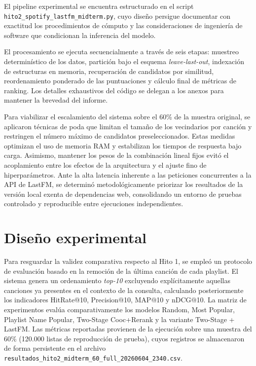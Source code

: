 \documentclass[10pt,letterpaper]{article}
\begin{document}
El pipeline experimental se encuentra estructurado en el script \texttt{hito2\_spotify\_lastfm\_midterm.py}, cuyo diseño persigue documentar con exactitud los procedimientos de cómputo y las consideraciones de ingeniería de software que condicionan la inferencia del modelo.

El procesamiento se ejecuta secuencialmente a través de seis etapas: muestreo determinístico de los datos, partición bajo el esquema \textit{leave-last-out}, indexación de estructuras en memoria, recuperación de candidatos por similitud, reordenamiento ponderado de las puntuaciones y cálculo final de métricas de ranking. Los detalles exhaustivos del código se delegan a los anexos para mantener la brevedad del informe.

Para viabilizar el escalamiento del sistema sobre el 60\% de la muestra original, se aplicaron técnicas de poda que limitan el tamaño de los vecindarios por canción y restringen el número máximo de candidatos preseleccionados. Estas medidas optimizan el uso de memoria RAM y estabilizan los tiempos de respuesta bajo carga. Asimismo, mantener los pesos de la combinación lineal fijos evitó el acoplamiento entre los efectos de la arquitectura y el ajuste fino de hiperparámetros. Ante la alta latencia inherente a las peticiones concurrentes a la API de LastFM, se determinó metodológicamente priorizar los resultados de la versión local exenta de dependencias web, consolidando un entorno de pruebas controlado y reproducible entre ejecuciones independientes.

\section{Diseño experimental}

Para resguardar la validez comparativa respecto al Hito 1, se empleó un protocolo de evaluación basado en la remoción de la última canción de cada playlist. El sistema genera un ordenamiento \textit{top-10} excluyendo explícitamente aquellas canciones ya presentes en el contexto de la consulta, calculando posteriormente los indicadores HitRate@10, Precision@10, MAP@10 y nDCG@10. La matriz de experimentos evalúa comparativamente los modelos Random, Most Popular, Playlist Name Popular, Two-Stage Cooc+Rerank y la variante Two-Stage + LastFM. Las métricas reportadas provienen de la ejecución sobre una muestra del 60\% (120.000 listas de reproducción de prueba), cuyos registros se almacenaron de forma persistente en el archivo \texttt{resultados\_hito2\_midterm\_60\_full\_20260604\_2340.csv}.
\end{document}
